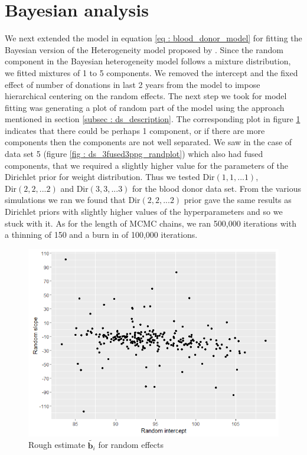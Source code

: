 \section{Bayesian analysis}
\label{sec : blood_donor_bayesian_analysis}
We next extended the model in equation \ref{eq : blood_donor_model} for fitting the Bayesian version of the Heterogeneity model proposed by \citet{verbeke_linear_1996}. Since the random component in the Bayesian heterogeneity model follows a mixture distribution, we fitted mixtures of 1 to 5 components. We removed the intercept and the fixed effect of number of donations in last 2 years from the model to impose hierarchical centering on the random effects. The next step we took for model fitting was generating a plot of random part of the model using the approach mentioned in section \ref{subsec : ds_description}. The corresponding plot in figure \ref{fig : rough_idea_blood_donor} indicates that there could be perhaps 1 component, or if there are more components then the components are not well separated. We saw in the case of data set 5 (figure \ref{fig : ds_3fused3ppg_randplot}) which also had fused components, that we required a slightly higher value for the parameters of the Dirichlet prior for weight distribution. Thus we tested $\text{Dir}(1, 1,...1)$, $\text{Dir}(2, 2,...2)$ and $\text{Dir}(3, 3,...3)$ for the blood donor data set. From the various simulations we ran we found that $\text{Dir}(2, 2,...2)$ prior gave the same results as Dirichlet priors with slightly higher values of the hyperparameters and so we stuck with it. As for the length of MCMC chains, we ran 500,000 iterations with a thinning of 150 and a burn in of 100,000 iterations.\\

\begin{figure}
	\centering
	\includegraphics[scale=0.5]{mainmatter/chapter_6_blood_donor/rough_estimate_random_effects.png}
	\caption{Rough estimate $\tilde{\boldsymbol{b}_i}$ for random effects}
	\label{fig : rough_idea_blood_donor}
\end{figure}

